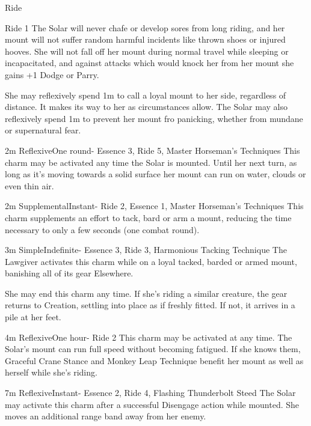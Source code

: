 \begin{Ability}{Ride}

  {Ride 1}
  The Solar will never chafe or develop sores from long riding, and her mount will not suffer random harmful incidents like thrown shoes or injured hooves. She will not fall off her mount during normal travel while sleeping or incapacitated, and against attacks which would knock her from her mount she gains +1 Dodge or Parry.

  She may reflexively spend 1m to call a loyal mount to her side, regardless of distance. It makes its way to her as circumstances allow. The Solar may also reflexively spend 1m to prevent her mount fro panicking, whether from mundane or supernatural fear.

  {2m}
  {Reflexive}{One round}{-}
  {Essence 3, Ride 5, Master Horseman's Techniques}
  This charm may be activated any time the Solar is mounted. Until her next turn, as long as it's moving towards a solid surface her mount can run on water, clouds or even thin air.

  {2m}
  {Supplemental}{Instant}{-}
  {Ride 2, Essence 1, Master Horseman's Techniques}
  This charm supplements an effort to tack, bard or arm a mount, reducing the time necessary to only a few seconds (one combat round).

  {3m}
  {Simple}{Indefinite}{-}
  {Essence 3, Ride 3, Harmonious Tacking Technique}
  The Lawgiver activates this charm while on a loyal tacked, barded or armed mount, banishing all of its gear Elsewhere.

  She may end this charm any time. If she's riding a similar creature, the gear returns to Creation, settling into place as if freshly fitted. If not, it arrives in a pile at her feet.

  {4m}
  {Reflexive}{One hour}{-}
  {Ride 2}
  This charm may be activated at any time. The Solar's mount can run full speed without becoming fatigued. If she knows them, Graceful Crane Stance and Monkey Leap Technique benefit her mount as well as herself while she's riding.

  {7m}
  {Reflexive}{Instant}{-}
  {Essence 2, Ride 4, Flashing Thunderbolt Steed}
  The Solar may activate this charm after a successful Disengage action while mounted. She moves an additional range band away from her enemy.


\end{Ability}
